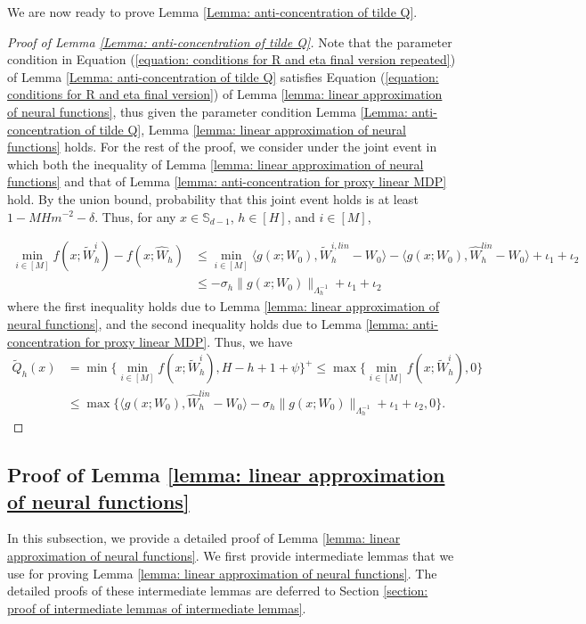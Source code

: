 \documentclass{article} \usepackage{iclr2023/iclr2023_conference,times}
\begin{document}
We are now ready to prove Lemma \ref{Lemma: anti-concentration of tilde Q}. 
\begin{proof}[Proof of Lemma \ref{Lemma: anti-concentration of tilde Q}]
Note that the parameter condition in Equation (\ref{equation: conditions for R and eta final version repeated}) of Lemma \ref{Lemma: anti-concentration of tilde Q} satisfies Equation (\ref{equation: conditions for R and eta final version}) of Lemma \ref{lemma: linear approximation of neural functions}, thus given the parameter condition Lemma \ref{Lemma: anti-concentration of tilde Q}, Lemma \ref{lemma: linear approximation of neural functions} holds. For the rest of the proof, we consider under the joint event in which both the inequality of Lemma \ref{lemma: linear approximation of neural functions} and that of Lemma \ref{lemma: anti-concentration for proxy linear MDP} hold. By the union bound, probability that this joint event holds is at least $1 - MH m^{-2} - \delta$. Thus, for any $x \in \mathbb{S}_{d-1}$, $h \in [H]$, and $i \in [M]$, 

\begin{align*}
    \min_{i \in [M]} f(x; \tilde{W}^{i}_h) - f(x; \hat{W}_h) &\leq \min_{i \in [M]} \langle g(x; W_0), \tilde{W}^{i,lin}_h - W_0 \rangle  - \langle g(x; W_0), \hat{W}_h^{lin} - W_0 \rangle + \iota_1 + \iota_2 \\
    &\leq -\sigma_h \| g(x; W_0) \|_{\Lambda_h^{-1}} + \iota_1 + \iota_2
\end{align*}
where the first inequality holds due to Lemma \ref{lemma: linear approximation of neural functions}, and the second inequality holds due to Lemma \ref{lemma: anti-concentration for proxy linear MDP}. Thus, we have 
\begin{align*}
    \tilde{Q}_h(x) &= \min \{\min_{i \in [M]} f(x; \tilde{W}^i_h), H - h +1 + \psi \}^{+} \leq \max\{\min_{i \in [M]} f(x; \tilde{W}^i_h), 0\} \\
    &\leq \max\{\langle g(x; W_0), \hat{W}_h^{lin} - W_0 \rangle  -\sigma_h \| g(x; W_0) \|_{\Lambda_h^{-1}} + \iota_1 + \iota_2, 0\}. 
\end{align*}



\end{proof}

\subsection{Proof of Lemma \ref{lemma: linear approximation of neural functions}}
\label{subsection: proof of linear approximation lemma}
In this subsection, we provide a detailed proof of Lemma \ref{lemma: linear approximation of neural functions}. We first provide intermediate lemmas that we use for proving Lemma \ref{lemma: linear approximation of neural functions}. The detailed proofs of these intermediate lemmas are deferred to Section \ref{section: proof of intermediate lemmas of intermediate lemmas}. 
\end{document}
